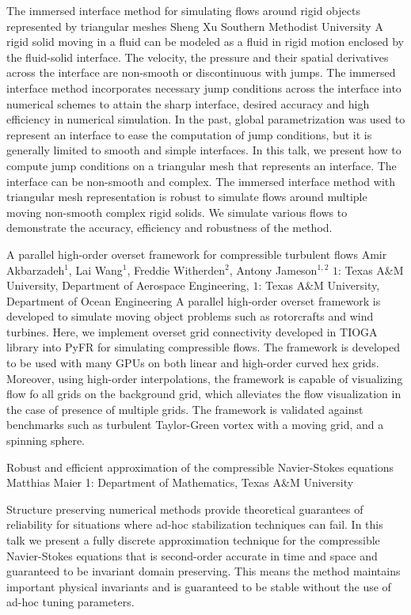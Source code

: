 \begin{addmargin}[2em]{0em}
\vspace{1.5ex}
\abs
{The immersed interface method for simulating flows around rigid objects represented by triangular meshes}
{Sheng Xu}
{Southern Methodist University}
{A rigid solid moving in a fluid can be modeled as a fluid in rigid motion enclosed by the fluid-solid interface.  The velocity, the pressure and their spatial derivatives across the interface are non-smooth or discontinuous with jumps. The immersed interface method incorporates necessary jump conditions across the interface into numerical schemes to attain the sharp interface, desired accuracy and high efficiency in numerical simulation. In the past, global parametrization was used to represent an interface to ease the computation of jump conditions, but it is generally limited to smooth and simple interfaces. In this talk, we present how to compute jump conditions on a triangular mesh that represents an interface. The interface can be non-smooth and complex. The immersed interface method with triangular mesh representation is robust to simulate flows around multiple moving non-smooth complex rigid solids. We simulate various flows to demonstrate the accuracy, efficiency and robustness of the method.}


\vspace{1.5ex}
\abs
{A parallel high-order overset framework for compressible turbulent flows}
{Amir Akbarzadeh$^1$, Lai Wang$^1$, Freddie Witherden$^2$, Antony Jameson$^{1,2}$}
{$1$: Texas A\&M University, Department of Aerospace Engineering, $1$: Texas A\&M University, Department of Ocean Engineering}
{A parallel high-order overset framework is developed to simulate moving object problems such as rotorcrafts and wind turbines. Here, we implement overset grid connectivity developed in TIOGA library into PyFR for simulating compressible flows. The framework is developed to be used with many GPUs on both linear and high-order curved hex grids. Moreover, using high-order interpolations, the framework is capable of visualizing flow fo all grids on the background grid, which alleviates the flow visualization in the case of presence of multiple grids. The framework is validated against benchmarks such as turbulent Taylor-Green vortex with a moving grid, and a spinning sphere.}


\vspace{1.5ex}
\abs
{Robust and efficient approximation of the compressible Navier-Stokes equations}
{Matthias Maier}
{1: Department of Mathematics, Texas A\&M University}
{
	Structure preserving numerical methods provide theoretical guarantees of
	reliability for situations where ad-hoc stabilization techniques can fail.
	In this talk we present a fully discrete approximation technique for the
	compressible Navier-Stokes equations that is second-order accurate in
	time and space and guaranteed to be invariant domain preserving. This
	means the method maintains important physical invariants and is
	guaranteed to be stable without the use of ad-hoc tuning parameters.

}
\end{addmargin}

